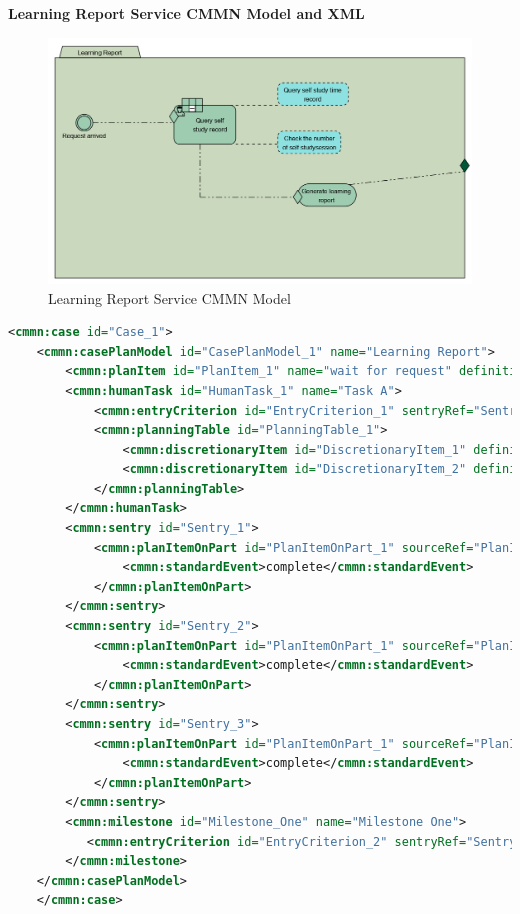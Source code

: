 \documentclass[runningheads]{llncs}
\begin{document}
    \textbf{Learning Report Service CMMN Model and XML}\\
    \begin{figure}
        \centering %
        \includegraphics[width=1.0\textwidth]{figure/hyy/CMMN} %
       \caption{Learning Report Service CMMN Model} %
        \label{Learning Report} %
   \end{figure}
   \begin{lstlisting}[language={XML}]
   <cmmn:case id="Case_1">
    <cmmn:casePlanModel id="CasePlanModel_1" name="Learning Report">
        <cmmn:planItem id="PlanItem_1" name="wait for request" definitionRef="TimerEventListener" />
        <cmmn:humanTask id="HumanTask_1" name="Task A">
            <cmmn:entryCriterion id="EntryCriterion_1" sentryRef="Sentry_1" />
            <cmmn:planningTable id="PlanningTable_1">
                <cmmn:discretionaryItem id="DiscretionaryItem_1" definitionRef="HumanTask_2"/>
                <cmmn:discretionaryItem id="DiscretionaryItem_2" definitionRef="HumanTask_3"/>
            </cmmn:planningTable>
        </cmmn:humanTask>
        <cmmn:sentry id="Sentry_1">
            <cmmn:planItemOnPart id="PlanItemOnPart_1" sourceRef="PlanItem_1">
                <cmmn:standardEvent>complete</cmmn:standardEvent>
            </cmmn:planItemOnPart>
        </cmmn:sentry>
        <cmmn:sentry id="Sentry_2">
            <cmmn:planItemOnPart id="PlanItemOnPart_1" sourceRef="PlanItem_1">
                <cmmn:standardEvent>complete</cmmn:standardEvent>
            </cmmn:planItemOnPart>
        </cmmn:sentry>
        <cmmn:sentry id="Sentry_3">
            <cmmn:planItemOnPart id="PlanItemOnPart_1" sourceRef="PlanItem_1">
                <cmmn:standardEvent>complete</cmmn:standardEvent>
            </cmmn:planItemOnPart>
        </cmmn:sentry>
        <cmmn:milestone id="Milestone_One" name="Milestone One">
           <cmmn:entryCriterion id="EntryCriterion_2" sentryRef="Sentry_2" />
        </cmmn:milestone>
    </cmmn:casePlanModel>
    </cmmn:case>

    \end{lstlisting}
	\clearpage
	
\end{document}
